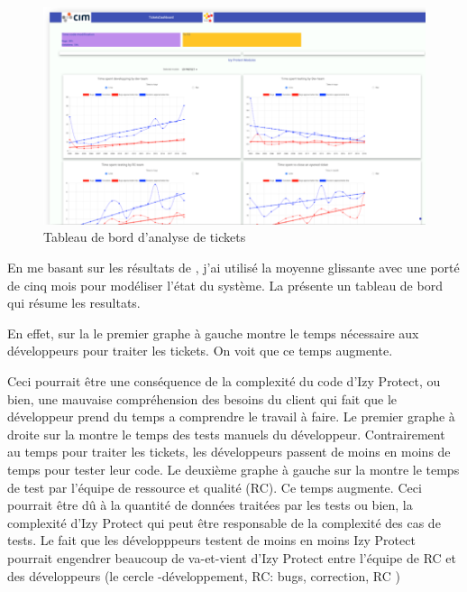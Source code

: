 \documentclass[a4paper]{article}
\begin{document}
\begin{figure}[htbp]
  \begin{center}
  \includegraphics[width=\linewidth]{./figures/dashboard.png}
  \caption{Tableau de bord d'analyse de tickets 
}
  \label{fig:dashboardFig}
\end{center}
\vspace{-0.3cm}
\end{figure}
En me basant sur les résultats de \cite{Raja09}, j'ai utilisé la moyenne glissante avec une porté de cinq mois pour modéliser l'état du système.
La  présente un tableau de bord qui résume les resultats.

En effet, sur la  le premier graphe à gauche montre le temps nécessaire aux développeurs pour traiter les tickets. 
On voit que ce temps augmente.

Ceci pourrait être une conséquence de la complexité du code d'Izy Protect, ou bien, une mauvaise compréhension des besoins du client qui fait que le développeur prend du temps a comprendre le travail à faire.
Le premier graphe à droite  sur la  montre le temps des tests manuels du développeur. 
Contrairement au temps pour traiter les tickets, les développeurs passent de moins en moins de temps pour tester leur code.
Le deuxième graphe à gauche  sur la  montre le temps de test par l'équipe de ressource et qualité (RC). Ce temps augmente.
Ceci pourrait être dû  à la quantité de données traitées par les tests ou bien, la complexité d'Izy Protect qui peut être responsable de la complexité des cas de tests.
Le fait que les développpeurs testent de moins en moins Izy Protect  pourrait engendrer beaucoup de va-et-vient d'Izy Protect entre l'équipe de RC et des développeurs (le cercle -développement, RC: bugs, correction, RC )
\end{document}
